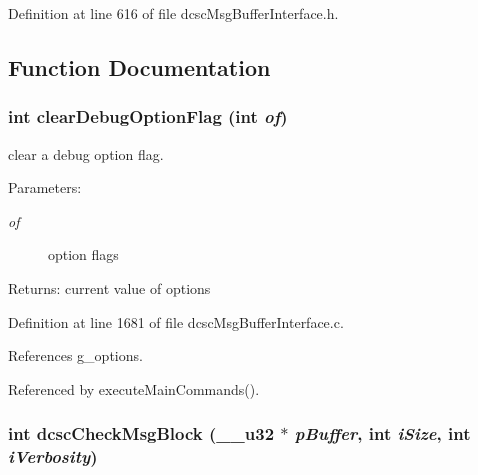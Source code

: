 


Definition at line 616 of file dcsc\-Msg\-Buffer\-Interface.h.

\subsection{Function Documentation}
\hypertarget{group__dcsc__msg__buffer__access_g41201fc4dd5608bce4261b34eec28ca4}{
\subsubsection[clearDebugOptionFlag]{\setlength{\rightskip}{0pt plus 5cm}int clear\-Debug\-Option\-Flag (int {\em of})}}
\label{group__dcsc__msg__buffer__access_g41201fc4dd5608bce4261b34eec28ca4}


clear a debug option flag. 

\begin{Desc}
\item[Parameters:]
\begin{description}
\item[{\em of}]option flags \end{description}
\end{Desc}
\begin{Desc}
\item[Returns:]current value of options \end{Desc}


Definition at line 1681 of file dcsc\-Msg\-Buffer\-Interface.c.

References g\_\-options.

Referenced by execute\-Main\-Commands().\hypertarget{group__dcsc__msg__buffer__access_g8dac87332689e82a586ef04eed99d083}{
\subsubsection[dcscCheckMsgBlock]{\setlength{\rightskip}{0pt plus 5cm}int dcsc\-Check\-Msg\-Block (\_\-\_\-u32 $\ast$ {\em p\-Buffer}, int {\em i\-Size}, int {\em i\-Verbosity})}}
\label{group__dcsc__msg__buffer__access_g8dac87332689e82a586ef04eed99d083}


